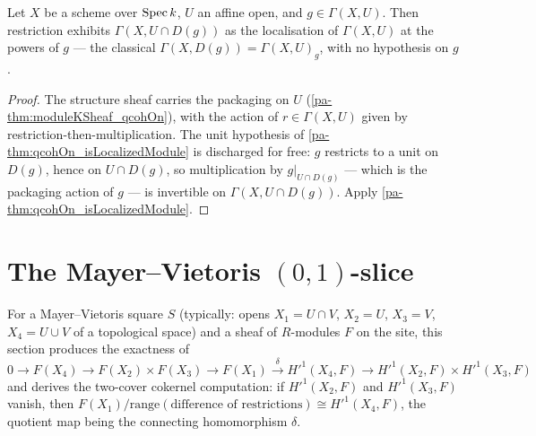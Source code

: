 \begin{theorem}
  \label{pa-thm:qcohOn_isLocalizedModule_moduleKSheaf}
  \leanok

  Let \(X\) be a scheme over \(\operatorname{Spec} k\), \(U\) an affine open, and \(g \in \Gamma(X, U)\).
  Then restriction exhibits \(\Gamma(X, U \cap D(g))\) as the localisation of
  \(\Gamma(X, U)\) at the powers of \(g\) --- the classical
  \(\Gamma(X, D(g)) = \Gamma(X, U)_g\), with no hypothesis on \(g\).
\end{theorem}
\begin{proof}
  \leanok
  The structure sheaf carries the packaging on \(U\) (\ref{pa-thm:moduleKSheaf_qcohOn}), with
  the action of \(r \in \Gamma(X, U)\) given by restriction-then-multiplication. The unit
  hypothesis of \ref{pa-thm:qcohOn_isLocalizedModule} is discharged for free: \(g\) restricts
  to a unit on \(D(g)\), hence on \(U \cap D(g)\), so multiplication by
  \(g|_{U \cap D(g)}\) --- which is the packaging action of \(g\) --- is invertible on
  \(\Gamma(X, U \cap D(g))\). Apply \ref{pa-thm:qcohOn_isLocalizedModule}.
\end{proof}

\section{The Mayer--Vietoris \((0,1)\)-slice}
\label{pa-sec:mv-in-text}

For a Mayer--Vietoris square \(S\) (typically: opens \(X_1 = U \cap V\), \(X_2 = U\),
\(X_3 = V\), \(X_4 = U \cup V\) of a topological space) and a sheaf of \(R\)-modules \(F\) on
the site, this section produces the exactness of
\[
  0 \to F(X_4) \to F(X_2) \times F(X_3) \to F(X_1)
    \xrightarrow{\;\delta\;} H'^1(X_4, F) \to H'^1(X_2, F) \times H'^1(X_3, F)
\]
and derives the two-cover cokernel computation: if \(H'^1(X_2, F)\) and \(H'^1(X_3, F)\)
vanish, then \(F(X_1)/\mathrm{range}(\text{difference of restrictions}) \cong H'^1(X_4, F)\),
the quotient map being the connecting homomorphism \(\delta\).

